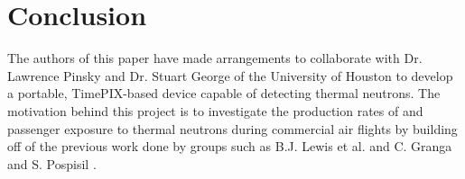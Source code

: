 \section{Conclusion}
\label{Conclusion}


The authors of this paper have made arrangements to collaborate with Dr. Lawrence Pinsky and Dr. Stuart George of the University of Houston to develop a portable, TimePIX-based device capable of detecting thermal neutrons. The motivation behind this project is to investigate the production rates of and passenger exposure to thermal neutrons during commercial air flights by building off of the previous work done by groups such as B.J. Lewis et al. \cite{aircrewexposure} and C. Granga and S. Pospisil \cite{timepixdosimetry}.
